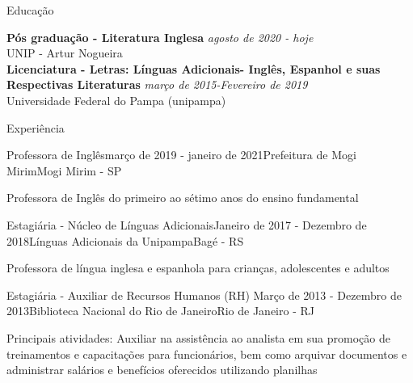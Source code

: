 \documentclass{resume} %
\begin{document}

\begin{rSection}{Educação}

{\bf Pós graduação - Literatura Inglesa} \hfill {\em agosto de 2020 - hoje} \\ 
UNIP - Artur Nogueira \\

{\bf Licenciatura - Letras: Línguas Adicionais- Inglês, Espanhol e suas Respectivas
Literaturas} \hfill {\em março de 2015-Fevereiro de 2019} \\ 
Universidade Federal do Pampa (unipampa) \\


\end{rSection}


\begin{rSection}{Experiência}

\begin{rSubsection}{Professora de Inglês}{março de 2019 - janeiro de 2021}{Prefeitura de Mogi Mirim}{Mogi Mirim - SP}
\item Professora de Inglês do primeiro ao sétimo anos do ensino fundamental
\end{rSubsection}


\begin{rSubsection}{Estagiária - Núcleo de Línguas Adicionais}{Janeiro de 2017 - Dezembro de 2018}{Línguas Adicionais da Unipampa}{Bagé - RS}
\item Professora de língua inglesa e espanhola para crianças, adolescentes e adultos
\end{rSubsection}


\begin{rSubsection}{Estagiária - Auxiliar de Recursos Humanos (RH)
}{Março de 2013 - Dezembro de 2013}{Biblioteca Nacional do Rio de Janeiro}{Rio de Janeiro - RJ }
\item Principais atividades: Auxiliar na assistência ao analista em sua promoção de treinamentos e
capacitações para funcionários, bem como arquivar documentos e administrar salários e benefícios
oferecidos utilizando planilhas
\end{rSubsection}

\end{rSection}
\end{document}
